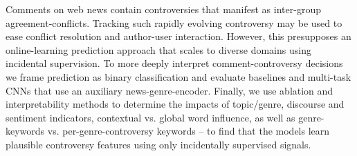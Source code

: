 Comments on web news contain controversies that manifest as inter-group agreement-conflicts. Tracking such rapidly evolving controversy may be used to ease conflict resolution and author-user interaction. However, this presupposes an online-learning prediction approach that scales to diverse domains using incidental supervision. To more deeply interpret comment-controversy decisions we frame prediction as binary classification and evaluate baselines and multi-task CNNs that use an auxiliary news-genre-encoder. Finally, we use ablation and interpretability methods to determine the impacts of topic/genre, discourse and sentiment indicators, contextual vs. global word influence, as well as genre-keywords vs. per-genre-controversy keywords -- to find that the models learn plausible controversy features using only incidentally supervised signals.
